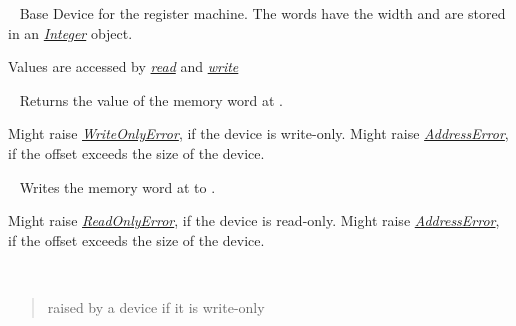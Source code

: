\documentclass[letterpaper,10pt,english]{sphinxmanual}
\begin{document}
\begin{fulllineitems}
\label{core:py_register_machine2.core.parts.WordDevice}~\label{core:worddevice}
Base Device for the register machine.
The words have the width  and are stored in an
{\hyperref[core:integer]{\emph{Integer}}} object.

Values are accessed by {\hyperref[core:read]{\emph{read}}} and {\hyperref[core:write]{\emph{write}}}

\begin{fulllineitems}
\label{core:py_register_machine2.core.parts.WordDevice.read}~\label{core:read}
Returns the value of the memory word at .

Might raise {\hyperref[core:writeonlyerror]{\emph{WriteOnlyError}}}, if the device is write-only.
Might raise {\hyperref[core:addresserror]{\emph{AddressError}}}, if the offset exceeds the size of the device.

\end{fulllineitems}


\begin{fulllineitems}
\label{core:py_register_machine2.core.parts.WordDevice.write}~\label{core:write}
Writes the memory word at  to .

Might raise {\hyperref[core:readonlyerror]{\emph{ReadOnlyError}}}, if the device is read-only.
Might raise {\hyperref[core:addresserror]{\emph{AddressError}}}, if the offset exceeds the size of the device.

\end{fulllineitems}


\end{fulllineitems}


\begin{fulllineitems}
\label{core:py_register_machine2.core.parts.WriteOnlyError}~\label{core:writeonlyerror}\begin{quote}

raised by a device if it is write-only
\end{quote}

\end{fulllineitems}
\end{document}
